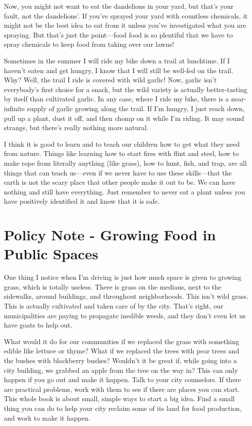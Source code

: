 Now, you might not want to eat the dandelions in your yard, but that’s
your fault, not the dandelions’. If you’ve sprayed your yard with
countless chemicals, it might not be the best idea to eat from it
unless you’ve investigated what you are spraying. But that’s just the
point—food food is so plentiful that we have to spray chemicals to keep
food from taking over our lawns!

Sometimes in the summer I will ride my bike down a trail at lunchtime.
If I haven’t eaten and get hungry, I know that I will still be well-fed
on the trail. Why?  Well, the trail I ride is covered with wild garlic!
 Now, garlic isn’t everybody’s first choice for a snack, but the wild
variety is actually better-tasting by itself than cultivated garlic. In
any case, where I ride my bike, there is a near-infinite supply of
garlic growing along the trail. If I’m hungry, I just reach down, pull
up a plant, dust it off, and then chomp on it while I’m riding. It may
sound strange, but there’s really nothing more natural.

I think it is good to learn and to teach our children how to get what
they need from nature. Things like learning how to start fires with
flint and steel, how to make rope from literally anything (like grass),
how to hunt, fish, and trap, are all things that can teach us—even if
we never have to use these skills—that the earth is not the scary place
that other people make it out to be. We can have nothing and still have
everything. Just remember to never eat a plant unless you have
positively identified it and know that it is safe.

\section{Policy Note - Growing Food in Public Spaces}

One thing I notice when I’m driving is just how much space is given to
growing grass, which is totally useless. There is grass on the medians,
next to the sidewalks, around buildings, and throughout neighborhoods.
This isn’t wild grass. This is actually cultivated and taken care of by
the city. That’s right, our municipalities are paying to propagate
inedible weeds, and they don’t even let us have goats to help out.

What would it do for our communities if we replaced the grass with
something edible like lettuce or thyme?  What if we replaced the trees
with pear trees and the bushes with blackberry bushes?  Wouldn’t it be
great if, while going into a city building, we grabbed an apple from
the tree on the way in?  This can only happen if you go out and make it
happen. Talk to your city counselors. If there are practical problems,
work with them to see if there are places you can start. This whole
book is about small, simple ways to start a big idea. Find a small
thing you can do to help your city reclaim some of its land for food
production, and work to make it happen.

